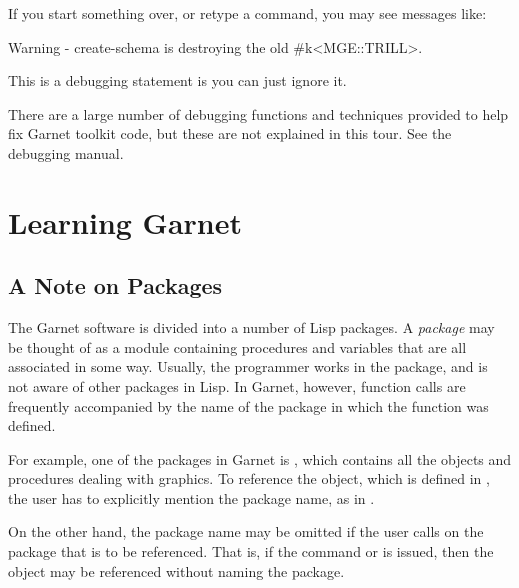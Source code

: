 If you start something over, or retype a command, you may see messages
like:
\begin{programexample}
Warning - create-schema is destroying the old \#k<MGE::TRILL>.
\end{programexample}
This is a debugging statement is you can just ignore it.

There are a large number of debugging functions and techniques provided to
help fix Garnet toolkit code, but these are not explained in this tour.
See the debugging manual.

% 
% 
% 
\chapter{Learning Garnet}
\label{LearnGarnet}

\section{A Note on Packages}

The Garnet software is divided into a number of Lisp packages.  A
{\it package} may be thought of as a module containing procedures and
variables that are all associated in some way.  Usually, the
programmer works in the  package, and is not aware of
other packages in Lisp.  In Garnet, however, function calls are
frequently accompanied by the name of the package in which the function
was defined.

For example, one of the packages in Garnet is , which
contains all the objects and procedures dealing with graphics.  To
reference the  object, which is defined in ,
the user has to explicitly mention the package name, as in
.

On the other hand, the package name may be omitted if the user
calls  on the package that is to be referenced.  That
is, if the command  or  is issued, then the  object may be referenced
without naming the  package.

